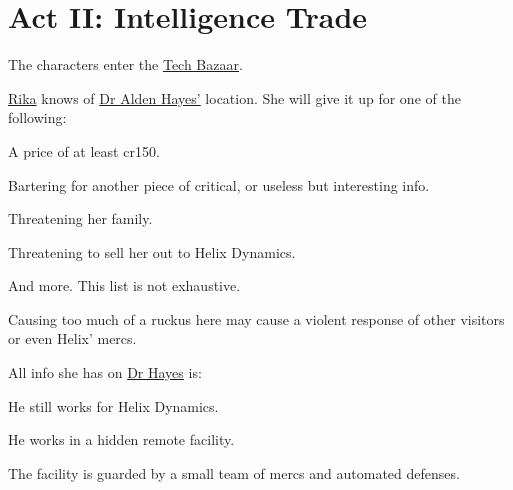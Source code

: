 \chapter{Act II: Intelligence Trade}
\label{ch:act2}
The characters enter the \hyperref[location:techbazaar]{Tech Bazaar}.
\par
\hyperref[char:rika]{Rika} knows of \hyperref[char:hayes]{Dr Alden Hayes'} location.
She will give it up for one of the following:
\begin{sitemize}
	\item A price of at least cr150.
	\item Bartering for another piece of critical, or useless but interesting info.
	\item Threatening her family.
	\item Threatening to sell her out to Helix Dynamics.
	\item And more.
		This list is not exhaustive.
\end{sitemize}

Causing too much of a ruckus here
	may cause a violent response of other visitors
	or even Helix' mercs.

All info she has on \hyperref[char:hayes]{Dr Hayes} is:
\begin{sitemize}
	\item He still works for Helix Dynamics.
	\item He works in a hidden remote facility.
	\item The facility is guarded by a small team of mercs and automated defenses.
\end{sitemize}
